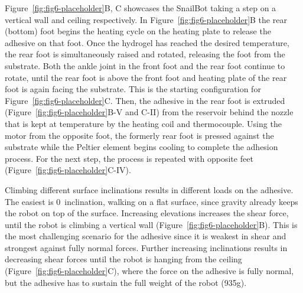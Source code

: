 Figure~\ref{fig:fig6-placeholder}B, C showcases the SnailBot taking a step on a vertical wall and ceiling respectively. In Figure~\ref{fig:fig6-placeholder}B the rear (bottom) foot begins the heating cycle on the heating plate to release the adhesive on that foot. Once the hydrogel has reached the desired temperature, the rear foot is simultaneously raised and rotated, releasing the foot from the substrate. Both the ankle joint in the front foot and the rear foot continue to rotate, until the rear foot is above the front foot and heating plate of the rear foot is again facing the substrate. This is the starting configuration for Figure~\ref{fig:fig6-placeholder}C. Then, the adhesive in the rear foot is extruded (Figure~\ref{fig:fig6-placeholder}B-V and C-II) from the reservoir behind the nozzle that is kept at temperature by the heating coil and thermocouple. Using the motor from the opposite foot, the formerly rear foot is pressed against the substrate while the Peltier element begins cooling to complete the adhesion process. For the next step, the process is repeated with opposite feet (Figure~\ref{fig:fig6-placeholder}C-IV).


Climbing different surface inclinations results in different loads on the adhesive.
The easiest is 0\degree\, inclination, walking on a flat surface, since gravity already keeps the robot on top of the surface. Increasing elevations increases the shear force, until the robot is climbing a vertical wall (Figure~\ref{fig:fig6-placeholder}B). This is the most challenging scenario for the adhesive since it is weakest in shear and strongest against fully normal forces. Further increasing inclinations results in decreasing shear forces until the robot is hanging from the ceiling (Figure~\ref{fig:fig6-placeholder}C), where the force on the adhesive is fully normal, but the adhesive has to sustain the full weight of the robot (935g). 

